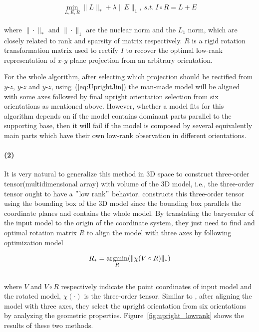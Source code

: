 \small{
\begin{equation}
 \label{eq:UprightJin}
 \min_{L,E,R}\|L\|_{*}+\lambda\|E\|_{1},~s.t.~I\circ R=L+E
\end{equation}
}
\\
where $\|\cdot\|_{*}$ and $\|\cdot\|_1$ are the nuclear norm and the $L_1$ norm,
which are closely related to rank and sparsity of matrix respectively.
$R$ is a rigid rotation transformation matrix used to rectify $I$ to recover the optimal low-rank representation of $x$-$y$ plane projection from an arbitrary orientation.

For the whole algorithm, after selecting which projection should be rectified from $y$-$z$, $y$-$z$ and $y$-$z$,
using~(\ref{eq:UprightJin}) the man-made model will be aligned with some axes followed by final upright orientation selection from six orientations as mentioned above.
However, whether a model fits for this algorithm depends on if the model contains dominant parts parallel to the supporting base,
then it will fail if the model is composed by several equivalently main parts which have their own low-rank observation in different orientations.%

\paragraph{(2)}It is very natural to generalize this method in 3D space to construct three-order tensor(multidimensional array) with volume of the 3D model, i.e., the three-order tensor ought to have a $"$low rank$"$ behavior. \cite{wang2014upright} constructs this three-order tensor using the bounding box of the 3D model since the bounding box parallels the coordinate planes and contains the whole model. By translating the barycenter of the input model to the origin of the coordinate system, they just need to find and optimal rotation matrix $R$ to align the model with three axes by following optimization model

\small{
\begin{equation}
 \label{eq:UprightJin}
 R_{*}=\mathop{\operatorname*{argmin}}_{R}(\|\chi(V\circ R)\|_{*})
\end{equation}
}
\\
where $V$ and $V\circ R$ respectively indicate the point coordinates of input model and the rotated model, $\chi(\cdot)$ is the three-order tensor. Similar to \cite{jin2012unsupervised}, after aligning the model with three axes, they select the upright orientation from six orientations by analyzing the geometric properties.
%
Figure~\ref{fig:upright_lowrank} shows the results of these two methods.


